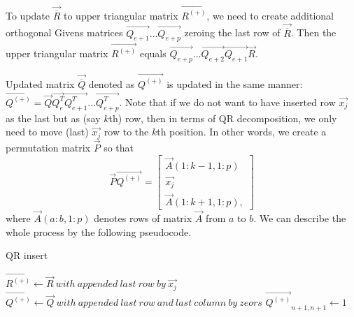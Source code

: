 To update $\vec{\overline{R}}$ to upper triangular matrix $\vec{R^{(+)}}$, we need to create additional orthogonal Givens matrices $\vec{Q_{e+1}}\ldots\vec{Q_{e+p}}$ zeroing the last row of  $\vec{\overline{R}}$. Then the upper triangular matrix $\vec{R^{(+)}}$ equals $ \vec{Q_{e+p}} \ldots \vec{Q_{e+2}} \vec{Q_{e+1}} \vec{R}$. 

Updated matrix $\vec{\overline{Q}}$ denoted as $\vec{Q^{(+)}}$
is updated in the same manner: $\vec{Q^{(+)}} = \vec{Q}\vec{Q_e^T}\vec{Q_{e+1}^T}\ldots\vec{Q_{e+p}^T}$.
Note that if we do not want to have inserted row $\vec{x_j}$ as the last but as (say $k$th) row, then in terms of QR decomposition, we only need to move (last) $\vec{x_j}$ row to the $k$th position. In other words, we create a permutation  matrix $\vec{P}$ so that 
\begin{equation}
    \vec{P}\vec{Q^{(+)}} = \begin{bmatrix}
        \vec{A}(1:k-1 , 1:p) \\
        \vec{x_j} \\
        \vec{A}(1:k+1 , 1:p), 
    \end{bmatrix}
\end{equation} 
where $\vec{A}(a:b , 1:p) $ denotes rows of matrix $\vec{A}$ from $a$ to $b$.
We can describe the whole process by the following pseudocode. 



\begin{algorithm}[H]
    \label{addingrowqr}

      \caption{QR insert}
      $\vec{R^{(+)}} \gets \vec{R}~with~appended~last~row~by~\vec{x_j}$\;
      $\vec{Q^{(+)}} \gets \vec{Q}~with~appended~last~row~and~last~column~by~zeors$\;
      $\vec{Q^{(+)}}_{n+1, n+1} \gets 1$ 


      

    \;
\end{algorithm}


